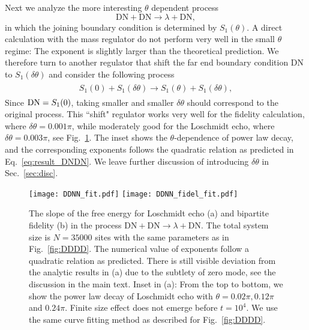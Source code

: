 Next we analyze the more interesting $\theta$ dependent process
\begin{equation}
  \text{DN}+\text{DN}\rightarrow\lambda+\text{DN},
\end{equation}
in which the joining boundary condition is determined by $S_1(\theta)$. A direct calculation with the mass regulator do not perform very well in the small $\theta$ regime: The exponent is slightly larger than the theoretical prediction. We therefore turn to another regulator that shift the far end boundary condition DN to $S_1( \delta \theta )$ and consider the following process
\begin{eqnarray}\begin{aligned}
\label{eq:approx_DNDN}
S_1(0)+S_1(\delta\theta)\rightarrow S_1(\theta)+S_1(\delta\theta),
\end{aligned}\end{eqnarray}
Since ${\rm DN} = S_1 (0 )$, taking smaller and smaller $\delta \theta$ should correspond to the original process. This ``shift" regulator works very well for the fidelity calculation, where $\delta \theta = 0.001 \pi$, while moderately good for the Loschmidt echo, where $\delta \theta = 0.003\pi$, see Fig.~\ref{fig:DDNN}. The inset shows the $\theta$-dependence of power law decay, and the corresponding exponents follows the quadratic relation as predicted in Eq.~\eqref{eq:result_DNDN}. We leave further discussion of introducing $\delta\theta$ in Sec.~\ref{sec:disc}. 

\begin{figure}
  \centering
\texttt{[image: DDNN\_fit.pdf]}
\texttt{[image: DDNN\_fidel\_fit.pdf]}
    \caption{The slope of the free energy for Loschmidt echo (a) and bipartite fidelity (b) in the process $\text{DN}+\text{DN}\rightarrow\lambda+\text{DN}$. The total system size is $N=35000$ sites with the same parameters as in Fig.~\ref{fig:DDDD}. The numerical value of exponents follow a quadratic relation as predicted. There is still visible deviation from the analytic results in (a) due to the subtlety of zero mode, see the discussion in the main text. Inset in (a): From the top to bottom, we show the power law decay of Loschmidt echo with $\theta=0.02\pi, 0.12\pi $ and $0.24\pi$. Finite size effect does not emerge before $t=10^{4}$. We use the same curve fitting method as described for Fig.~\ref{fig:DDDD}.}
      \label{fig:DDNN}
\end{figure}

